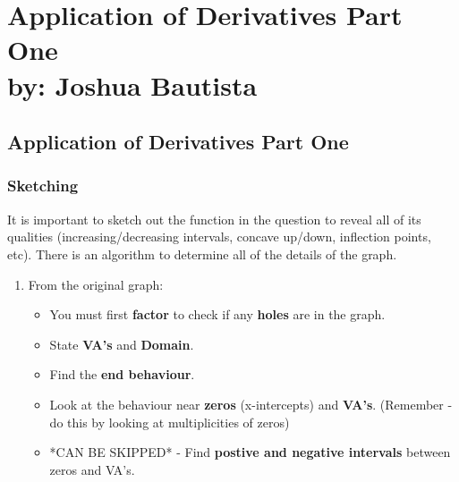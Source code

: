 \documentclass[12pt,fleqn]{book} %
\begin{document}
\part{Application of Derivatives Part One\\ by: Joshua Bautista}


\chapter{Application of Derivatives Part One}

\vspace*{-20mm}

\section{Sketching}

\vspace*{-7mm}

It is important to sketch out the function in the question to reveal all of its qualities (increasing/decreasing intervals, concave up/down, inflection points, etc).
There is an algorithm to determine all of the details of the graph.


\begin{enumerate}
    \item From the original graph:
          \begin{itemize}
              \item You must first \textbf{factor} to check if any \textbf{holes} are in the graph.
              \item State \textbf{VA's} and \textbf{Domain}.
              \item Find the \textbf{end behaviour}.
              \item Look at the behaviour near \textbf{zeros} (x-intercepts) and \textbf{VA's}. (Remember - do this by looking at multiplicities of zeros)
              \item *CAN BE SKIPPED* - Find \textbf{postive and negative intervals} between zeros and VA's.
          \end{itemize}
\end{enumerate}
\end{document}
